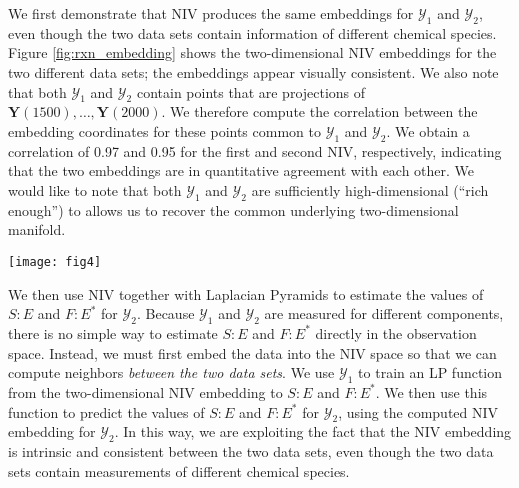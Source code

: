 \documentclass[aip,jcp,preprint]{revtex4-1}
\begin{document}
We first demonstrate that NIV produces the same embeddings for $\mathcal{Y}_1$ and $\mathcal{Y}_2$, even though the two data sets contain information of different chemical species.
%
Figure \ref{fig:rxn_embedding} shows the two-dimensional NIV embeddings for the two different data sets; the embeddings appear visually consistent.
%
We also note that both $\mathcal{Y}_1$ and $\mathcal{Y}_2$ contain points that are projections of $\mathbf{Y}(1500), \dots, \mathbf{Y}(2000)$.
%
We therefore compute the correlation between the embedding coordinates for these points common to $\mathcal{Y}_1$ and $\mathcal{Y}_2$.
%
We obtain a correlation of 0.97 and 0.95 for the first and second NIV, respectively, indicating that the two embeddings are in quantitative
agreement with each other.
%
We would like to note that both $\mathcal{Y}_1$ and $\mathcal{Y}_2$ are sufficiently high-dimensional (``rich enough'') to allows us to recover
the common underlying two-dimensional manifold.
%
\begin{figure*}[ht]
    \texttt{[image: fig4]}
    \caption{(a) NIV embedding obtained from $\mathcal{Y}_1$ (observations of components E, S, S:E, and F:E$^{*}$), colored by $S$. (b) NIV embedding obtained from $\mathcal{Y}_2$ (observations of components E, S, E:S, and D:S$^{*}$), colored by $S$. Visually, we can see that the embeddings obtained from $\mathcal{Y}_1$ and $\mathcal{Y}_2$ are consistent, even though the two data sets consist of observations of different chemical species. (c) Correlation of first NIV between two different embeddings (correlation=0.97). (d)  Correlation of second NIV between two different embeddings (correlation=0.95). We obtain a good quantitative agreement between the embedding coordinates for the two data sets.}
    \label{fig:rxn_embedding}
\end{figure*}

We then use NIV together with Laplacian Pyramids to estimate the values of $S:E$ and $F:E^{*}$ for $\mathcal{Y}_2$.
%
Because $\mathcal{Y}_1$ and $\mathcal{Y}_2$ are measured for different components, there is no simple way to estimate $S:E$ and $F:E^{*}$ directly in the observation space.
%
Instead, we must first embed the data into the NIV space so that we can compute neighbors {\em between the two data sets}.
%
We use $\mathcal{Y}_1$ to train an LP function from the two-dimensional NIV embedding to $S:E$ and $F:E^{*}$.
%
We then use this function to predict the values  of $S:E$ and $F:E^{*}$ for $\mathcal{Y}_2$, using the computed NIV embedding for $\mathcal{Y}_2$.
%
In this way, we are exploiting the fact that the NIV embedding is intrinsic and consistent between the two data sets, even though the two data sets contain measurements of different chemical species.
\end{document}
